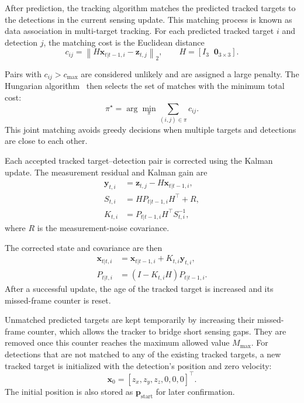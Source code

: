 After prediction, the tracking algorithm matches the predicted tracked targets to the detections in the current sensing update.
This matching process is known as data association in multi-target tracking.
For each predicted tracked target $i$ and detection $j$, the matching cost is the Euclidean distance
\begin{equation}
    c_{ij}
    =
    \left\|
    H\mathbf{x}_{t|t-1,i} - \mathbf{z}_{t,j}
    \right\|_2,
    \qquad
    H = [I_3 \;\; \mathbf{0}_{3\times 3}].
\end{equation}

Pairs with $c_{ij}>c_{\max}$ are considered unlikely and are assigned a large penalty.
The Hungarian algorithm~\cite{ref:hungarian} then selects the set of matches with the minimum total cost:
\begin{equation}
    \pi^\star
    =
    \arg\min_{\pi}
    \sum_{(i,j)\in\pi} c_{ij}.
\end{equation}
This joint matching avoids greedy decisions when multiple targets and detections are close to each other.

Each accepted tracked target--detection pair is corrected using the Kalman update.
The measurement residual and Kalman gain are
\begin{align}
    \mathbf{y}_{t,i} & =
    \mathbf{z}_{t,j} - H\mathbf{x}_{t|t-1,i}, \\
    S_{t,i}          & =
    H P_{t|t-1,i} H^{\!\top} + R,             \\
    K_{t,i}          & =
    P_{t|t-1,i} H^{\!\top} S_{t,i}^{-1},
\end{align}
where $R$ is the measurement-noise covariance.

The corrected state and covariance are then
\begin{align}
    \mathbf{x}_{t|t,i} & =
    \mathbf{x}_{t|t-1,i} + K_{t,i}\mathbf{y}_{t,i}, \\
    P_{t|t,i}          & =
    (I - K_{t,i}H)P_{t|t-1,i}.
\end{align}
After a successful update, the age of the tracked target is increased and its missed-frame counter is reset.

Unmatched predicted targets are kept temporarily by increasing their missed-frame counter, which allows the tracker to bridge short sensing gaps.
They are removed once this counter reaches the maximum allowed value $M_{\max}$.
For detections that are not matched to any of the existing tracked targets, a new tracked target is initialized with the detection's position and zero velocity:
\begin{equation}
    \mathbf{x}_{0}
    =
    [z_x, z_y, z_z, 0, 0, 0]^{\!\top}.
\end{equation}
The initial position is also stored as $\mathbf{p}_{\mathrm{start}}$ for later confirmation.

